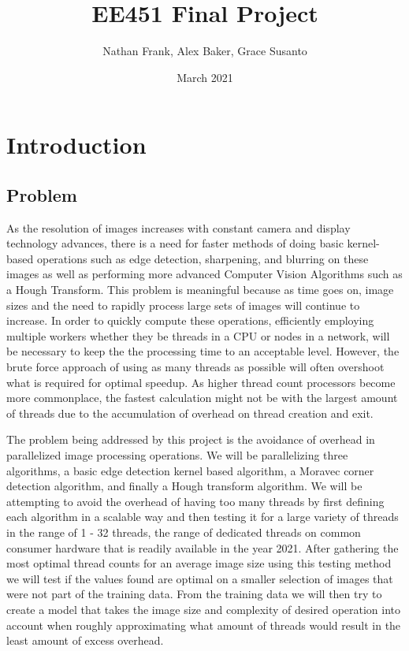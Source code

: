 \documentclass{article}
\title{EE451 Final Project}
\author{Nathan Frank, Alex Baker, Grace Susanto}
\date{March 2021}
\begin{document}
\maketitle

\section{Introduction}
     \subsection{Problem}
            As the resolution of images increases with constant camera and display technology advances, there is a need for faster methods of doing basic kernel-based operations such as edge detection, sharpening, and blurring on these images as well as performing more advanced Computer Vision Algorithms such as a Hough Transform.  This problem is meaningful because as time goes on, image sizes and the need to rapidly process large sets of images will continue to increase.  In order to quickly compute these operations, efficiently employing multiple workers whether they be threads in a CPU or nodes in a network, will be necessary to keep the the processing time to an acceptable level.  However, the brute force approach of using as many threads as possible will often overshoot what is required for optimal speedup.  As higher thread count processors become more commonplace, the fastest calculation might not be with the largest amount of threads due to the accumulation of overhead on thread creation and exit.
            
            The problem being addressed by this project is the avoidance of overhead in parallelized image processing operations.  We will be parallelizing three algorithms, a basic edge detection kernel based algorithm, a Moravec corner detection algorithm, and finally a Hough transform algorithm.  We will be attempting to avoid the overhead of having too many threads by first defining each algorithm in a scalable way and then testing it for a large variety of threads in the range of 1 - 32 threads, the range of dedicated threads on common consumer hardware that is readily available in the year 2021.  After gathering the most optimal thread counts for an average image size using this testing method we will test if the values found are optimal on a smaller selection of images that were not part of the training data.  From the training data we will then try to create a model that takes the image size and complexity of desired operation into account when roughly approximating what amount of threads would result in the least amount of excess overhead.
\end{document}
